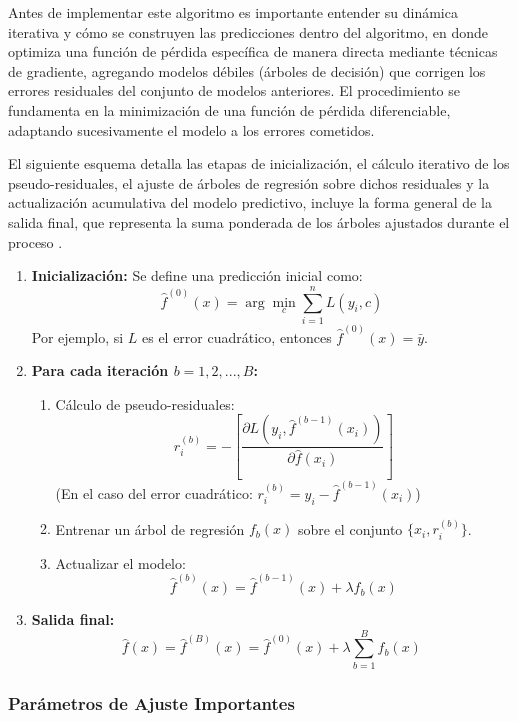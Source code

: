 Antes de implementar este algoritmo es importante entender su dinámica iterativa y cómo se construyen las predicciones dentro del algoritmo, en donde optimiza una función de pérdida específica de manera directa mediante técnicas de gradiente, agregando modelos débiles (árboles de decisión) que corrigen los errores residuales del conjunto de modelos anteriores. El procedimiento se fundamenta en la minimización de una función de pérdida diferenciable, adaptando sucesivamente el modelo a los errores cometidos\citep{james2013, hastie2009, friedman2001}.

El siguiente esquema detalla las etapas de inicialización, el cálculo iterativo de los pseudo-residuales, el ajuste de árboles de regresión sobre dichos residuales y la actualización acumulativa del modelo predictivo, incluye la forma general de la salida final, que representa la suma ponderada de los árboles ajustados durante el proceso \citep{james2013, hastie2009, friedman2001}.

\begin{enumerate}
	\item \textbf{Inicialización:} Se define una predicción inicial como:
	\[
	\hat{f}^{(0)}(x) = \arg\min_c \sum_{i=1}^n L(y_i, c)
	\]
	Por ejemplo, si $L$ es el error cuadrático, entonces $\hat{f}^{(0)}(x) = \bar{y}$.
	
	\item \textbf{Para cada iteración $b = 1, 2, ..., B$:}
	\begin{enumerate}
		\item Cálculo de pseudo-residuales:
		\[
		r_i^{(b)} = -\left[ \frac{\partial L(y_i, \hat{f}^{(b-1)}(x_i))}{\partial \hat{f}(x_i)} \right]
		\]
		(En el caso del error cuadrático: $r_i^{(b)} = y_i - \hat{f}^{(b-1)}(x_i)$)
		
		\item Entrenar un árbol de regresión $f_b(x)$ sobre el conjunto $\{x_i, r_i^{(b)}\}$.
		
		\item Actualizar el modelo:
		\[
		\hat{f}^{(b)}(x) = \hat{f}^{(b-1)}(x) + \lambda f_b(x)
		\]
	\end{enumerate}
	
	\item \textbf{Salida final:}
	\[
	\hat{f}(x) = \hat{f}^{(B)}(x) = \hat{f}^{(0)}(x) + \lambda \sum_{b=1}^{B} f_b(x)
	\]
\end{enumerate}

\subsubsection{Parámetros de Ajuste Importantes}

